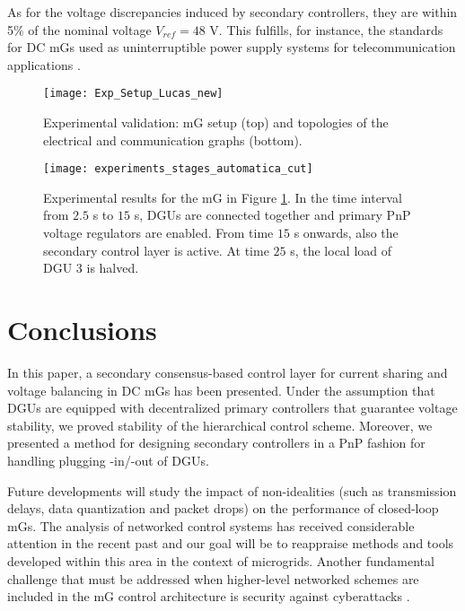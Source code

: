 \documentclass[a4paper]{article}
\theoremstyle{plain}
\begin{document}
As for the voltage discrepancies induced by secondary controllers, they are within 5$\%$ of the nominal voltage $V_{ref} = 48$ V. This fulfills, for instance, the standards for DC mGs used as uninterruptible power supply systems for telecommunication applications \cite{schulz2007etsi}.

\begin{figure}
	\centering
	\texttt{[image: Exp\_Setup\_Lucas\_new]}
	\caption{Experimental validation: mG setup (top) and topologies of the electrical and communication graphs (bottom).}
	\label{fig:experimental_setup}
\end{figure}
\begin{figure}
	\centering
	\hspace{-4mm}
	\texttt{[image: experiments\_stages\_automatica\_cut]}
	\caption{Experimental results for the mG in Figure \ref{fig:experimental_setup}. In the time interval from $2.5$ s to $15$ s, DGUs are connected together and primary PnP voltage regulators are enabled. From time $15$ s onwards, also the secondary control layer is active. At time $25$ s, the local load of DGU 3 is halved.}
	\label{fig:experiments}
\end{figure}

\section{Conclusions}
In this paper, a secondary consensus-based control layer for
current sharing and voltage balancing in DC mGs has been
presented. Under the assumption that DGUs are equipped with decentralized primary controllers that guarantee voltage stability, we proved stability of the hierarchical control scheme. Moreover, we presented a method for designing secondary
controllers in a PnP fashion for handling plugging -in/-out of DGUs. 

Future developments will study the impact of non-idealities (such as transmission delays, data quantization and packet drops) on the performance of closed-loop mGs. The analysis of networked control systems has received considerable attention in the recent past \cite{Hespanha2007} and our goal will be to reappraise methods and tools developed within this area in the context of microgrids. Another fundamental challenge that must be addressed when higher-level networked schemes are included in the mG control architecture is security against cyberattacks \cite{Pasqualetti2013}.




     \clearpage
\end{document}
